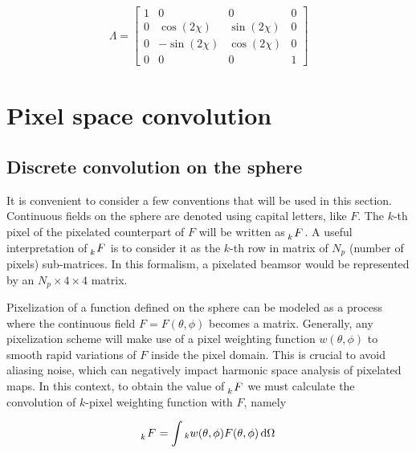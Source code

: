 \documentclass[a4paper,fleqn]{cas-dc}\sloppy
\begin{document}
\begin{equation}
\begin{aligned}
\Lambda =
\begin{bmatrix}
1  & 0 & 0 & 0\\
0  & \cos(2\chi) & \sin(2\chi) & 0\\
0  &-\sin(2\chi) & \cos(2\chi) & 0\\
0  & 0 & 0 & 1
\end{bmatrix}
\end{aligned}
\label{eq::lambda_operator}
\end{equation}

%
\section{Pixel space convolution}

\subsection{Discrete convolution on the sphere}

It is convenient to consider a few conventions that will be used in this section. Continuous fields on the sphere are denoted using capital letters, like $F$. The $k$-th pixel of the pixelated counterpart of $F$ will be written as $\tensor[_k]{F}{}$. A useful interpretation of $\tensor[_k]{F}{}$ is to consider it as the $k$-th row in matrix of $N_p$ (number of pixels) sub-matrices. In this formalism, a pixelated beamsor would be represented by an $N_p \times 4 \times 4$ matrix.

Pixelization of a function defined on the sphere can be modeled as a process where the continuous field $F = F(\theta,\phi)$ becomes a matrix. Generally, any pixelization scheme will make use of a pixel weighting function $w(\theta,\phi)$ to smooth rapid variations of $F$ inside the pixel domain. This is crucial to avoid aliasing noise, which can negatively impact harmonic space analysis of pixelated maps. In this context, to obtain the value of $\tensor[_k]{F}{}$ we must calculate the convolution of $k$-pixel weighting function with $F$, namely 

\begin{equation}
\begin{aligned}
\tensor[_k]{F}{} = \int {}_k w (\theta,\phi) F(\theta,\phi) \, \mathrm{d} \Omega
\end{aligned}
\label{eq::howtopixelate}
\end{equation}
\end{document}
